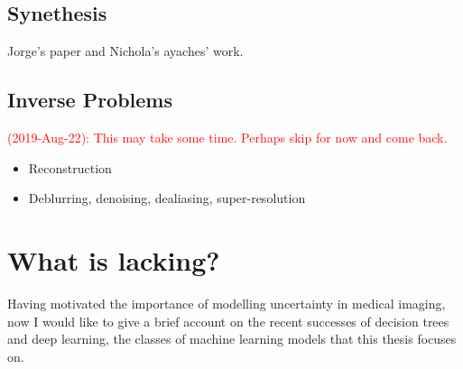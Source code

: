 
\subsection{Synethesis}
Jorge's paper and Nichola's ayaches' work. 

\subsection{Inverse Problems}
\textcolor{red}{(2019-Aug-22): This may take some time. Perhaps skip for now and come back.}
\begin{itemize}
	\item Reconstruction
	\item Deblurring, denoising, dealiasing, super-resolution 
\end{itemize}


\section{What is lacking?}
Having motivated the importance of modelling uncertainty in medical imaging, now I would like to give a brief account on the recent successes of decision trees and deep learning, the classes of machine learning models that this thesis focuses on. 

